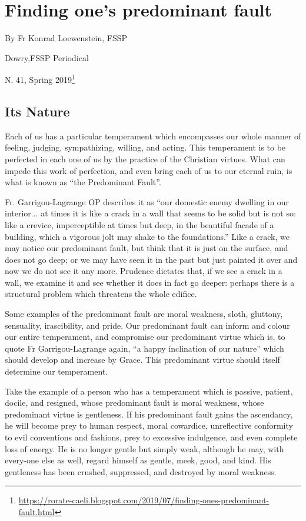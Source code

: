 \section{Finding one’s predominant fault }

By Fr Konrad Loewenstein, FSSP

Dowry,FSSP Periodical

N. 41, Spring 2019\footnote{\url{https://rorate-caeli.blogspot.com/2019/07/finding-ones-predominant-fault.html}}

\subsection*{Its Nature}

Each of us has a particular temperament which encompasses our whole manner of feeling, judging, sympathizing, willing, and acting. This temperament is to be perfected in each one of us by the practice of the Christian virtues. What can impede this work of perfection, and even bring each of us to our eternal ruin, is what is known as ``the Predominant Fault''. 

Fr. Garrigou-Lagrange OP describes it as ``our domestic enemy dwelling in our interior... at times it is like a crack in a wall that seems to be solid but is not so: like a crevice, imperceptible at times but deep, in the beautiful facade of a building, which a vigorous jolt may shake to the foundations.'' Like a crack, we may notice our predominant fault, but think that it is just on the surface, and does not go deep; or we may have seen it in the past but just painted it over and now we do not see it any more. Prudence dictates that, if we see a crack in a wall, we examine it and see whether it does in fact go deeper: perhaps there is a structural problem which threatens the whole edifice. 

Some examples of the predominant fault are moral weakness, sloth, gluttony, sensuality, irascibility, and pride. Our predominant fault can inform and colour our entire temperament, and compromise our predominant virtue which is, to quote Fr Garrigou-Lagrange again, ``a happy inclination of our nature'' which should develop and increase by Grace. This predominant virtue should itself determine our temperament. 

Take the example of a person who has a temperament which is passive, patient, docile, and resigned, whose predominant fault is moral weakness, whose predominant virtue is gentleness. If his predominant fault gains the ascendancy, he will become prey to human respect, moral cowardice, unreflective conformity to evil conventions and fashions, prey to excessive indulgence, and even complete loss of energy. He is no longer gentle but simply weak, although he may, with every-one else as well, regard himself as gentle, meek, good, and kind. His gentleness has been crushed, suppressed, and destroyed by moral weakness.

